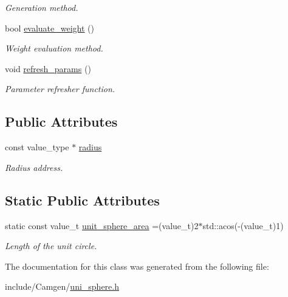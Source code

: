 \begin{DoxyCompactItemize}
\begin{DoxyCompactList}\small\item\em Generation method. \end{DoxyCompactList}\item 
\hypertarget{a00567_a263f0a0689c416c7e19df4d0e2ba816c}{}bool \hyperlink{a00567_a263f0a0689c416c7e19df4d0e2ba816c}{evaluate\+\_\+weight} ()\label{a00567_a263f0a0689c416c7e19df4d0e2ba816c}

\begin{DoxyCompactList}\small\item\em Weight evaluation method. \end{DoxyCompactList}\item 
\hypertarget{a00567_a687a2c0c27688eb85197baa7aec202f7}{}void \hyperlink{a00567_a687a2c0c27688eb85197baa7aec202f7}{refresh\+\_\+params} ()\label{a00567_a687a2c0c27688eb85197baa7aec202f7}

\begin{DoxyCompactList}\small\item\em Parameter refresher function. \end{DoxyCompactList}\end{DoxyCompactItemize}
\subsection*{Public Attributes}
\begin{DoxyCompactItemize}
\item 
\hypertarget{a00567_aaeed2171b5d9484e1bbca66bcbefec7d}{}const value\+\_\+type $\ast$ \hyperlink{a00567_aaeed2171b5d9484e1bbca66bcbefec7d}{radius}\label{a00567_aaeed2171b5d9484e1bbca66bcbefec7d}

\begin{DoxyCompactList}\small\item\em Radius address. \end{DoxyCompactList}\end{DoxyCompactItemize}
\subsection*{Static Public Attributes}
\begin{DoxyCompactItemize}
\item 
\hypertarget{a00567_acdc4fe773256e346168ba4ff630c00f1}{}static const value\+\_\+t \hyperlink{a00567_acdc4fe773256e346168ba4ff630c00f1}{unit\+\_\+sphere\+\_\+area} =(value\+\_\+t)2$\ast$std\+::acos(-\/(value\+\_\+t)1)\label{a00567_acdc4fe773256e346168ba4ff630c00f1}

\begin{DoxyCompactList}\small\item\em Length of the unit circle. \end{DoxyCompactList}\end{DoxyCompactItemize}


The documentation for this class was generated from the following file\+:\begin{DoxyCompactItemize}
\item 
include/\+Camgen/\hyperlink{a00822}{uni\+\_\+sphere.\+h}\end{DoxyCompactItemize}
